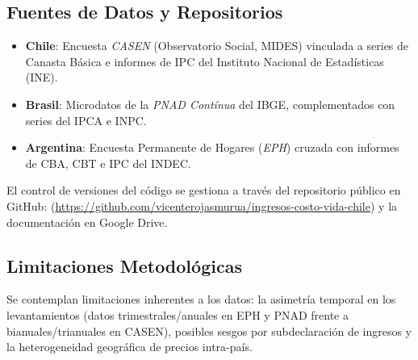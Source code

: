 \subsection{Fuentes de Datos y Repositorios}
\begin{itemize}
    \item \textbf{Chile}: Encuesta \textit{CASEN} (Observatorio Social, MIDES) vinculada a series de Canasta Básica e informes de IPC del Instituto Nacional de Estadísticas (INE).
    \item \textbf{Brasil}: Microdatos de la \textit{PNAD Contínua} del IBGE, complementados con series del IPCA e INPC.
    \item \textbf{Argentina}: Encuesta Permanente de Hogares (\textit{EPH}) cruzada con informes de CBA, CBT e IPC del INDEC.
\end{itemize}

El control de versiones del código se gestiona a través del repositorio público en GitHub:
(\url{https://github.com/vicenterojasmurua/ingresos-costo-vida-chile}) y la documentación en Google Drive.

\subsection{Limitaciones Metodológicas}
Se contemplan limitaciones inherentes a los datos: la asimetría temporal en los levantamientos (datos trimestrales/anuales en EPH y PNAD frente a bianuales/trianuales en CASEN), posibles sesgos por subdeclaración de ingresos y la heterogeneidad geográfica de precios intra-país.